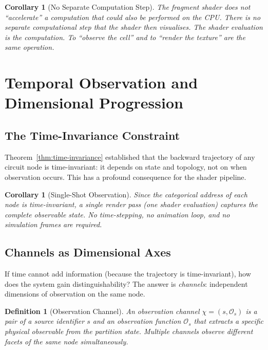 \documentclass[11pt,twocolumn,a4paper]{article}
\newtheorem{corollary}[theorem]{Corollary}
\newtheorem{definition}[theorem]{Definition}
\newcommand{\Obs}{\mathcal{O}}
\begin{document}
\begin{corollary}[No Separate Computation Step]
\label{cor:no-separate}
The fragment shader does not ``accelerate'' a computation that could
also be performed on the CPU.  There is no separate computational step
that the shader then visualises.  The shader evaluation \emph{is} the
computation.  To ``observe the cell'' and to ``render the texture''
are the same operation.
\end{corollary}



\section{Temporal Observation and Dimensional Progression}
\label{sec:temporal-observation}

\subsection{The Time-Invariance Constraint}

Theorem~\ref{thm:time-invariance} established that the backward
trajectory of any circuit node is time-invariant: it depends on state
and topology, not on when observation occurs.  This has a profound
consequence for the shader pipeline.

\begin{corollary}[Single-Shot Observation]
\label{cor:single-shot}
Since the categorical address of each node is time-invariant, a single
render pass (one shader evaluation) captures the complete observable
state.  No time-stepping, no animation loop, and no simulation frames
are required.
\end{corollary}

\subsection{Channels as Dimensional Axes}

If time cannot add information (because the trajectory is
time-invariant), how does the system gain distinguishability?  The
answer is \emph{channels}: independent dimensions of observation on
the same node.

\begin{definition}[Observation Channel]
\label{def:channel}
An \emph{observation channel} $\chi = (s, \Obs_s)$ is a pair of a
source identifier $s$ and an observation function $\Obs_s$ that
extracts a specific physical observable from the partition state.
Multiple channels observe different facets of the same node
simultaneously.
\end{definition}
\end{document}
